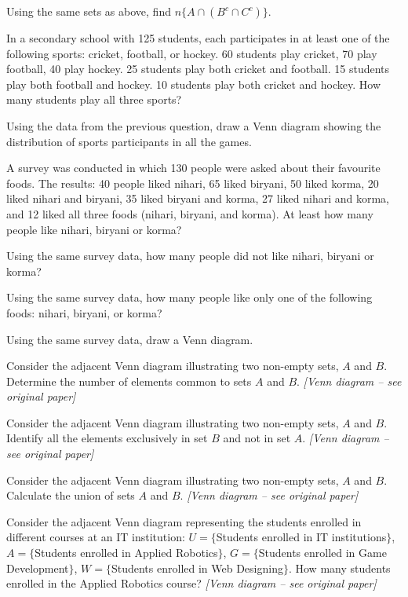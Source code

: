\documentclass[11pt]{article}
\begin{document}
\begin{wq}[start=56]
\item Using the same sets as above, find $n\{A\cap(B^c\cap C^c)\}$.

\item In a secondary school with 125 students, each participates in at least one of the following sports: cricket, football, or hockey. 60 students play cricket, 70 play football, 40 play hockey. 25 students play both cricket and football. 15 students play both football and hockey. 10 students play both cricket and hockey. How many students play all three sports?

\item Using the data from the previous question, draw a Venn diagram showing the distribution of sports participants in all the games.

\item A survey was conducted in which 130 people were asked about their favourite foods. The results: 40 people liked nihari, 65 liked biryani, 50 liked korma, 20 liked nihari and biryani, 35 liked biryani and korma, 27 liked nihari and korma, and 12 liked all three foods (nihari, biryani, and korma). At least how many people like nihari, biryani or korma?

\item Using the same survey data, how many people did not like nihari, biryani or korma?

\item Using the same survey data, how many people like only one of the following foods: nihari, biryani, or korma?

\item Using the same survey data, draw a Venn diagram.

\item Consider the adjacent Venn diagram illustrating two non-empty sets, $A$ and $B$. Determine the number of elements common to sets $A$ and $B$. \emph{[Venn diagram -- see original paper]}

\item Consider the adjacent Venn diagram illustrating two non-empty sets, $A$ and $B$. Identify all the elements exclusively in set $B$ and not in set $A$. \emph{[Venn diagram -- see original paper]}

\item Consider the adjacent Venn diagram illustrating two non-empty sets, $A$ and $B$. Calculate the union of sets $A$ and $B$. \emph{[Venn diagram -- see original paper]}

\item Consider the adjacent Venn diagram representing the students enrolled in different courses at an IT institution: $U=\{$Students enrolled in IT institutions$\}$, $A=\{$Students enrolled in Applied Robotics$\}$, $G=\{$Students enrolled in Game Development$\}$, $W=\{$Students enrolled in Web Designing$\}$. How many students enrolled in the Applied Robotics course? \emph{[Venn diagram -- see original paper]}


\end{wq}
\end{document}
